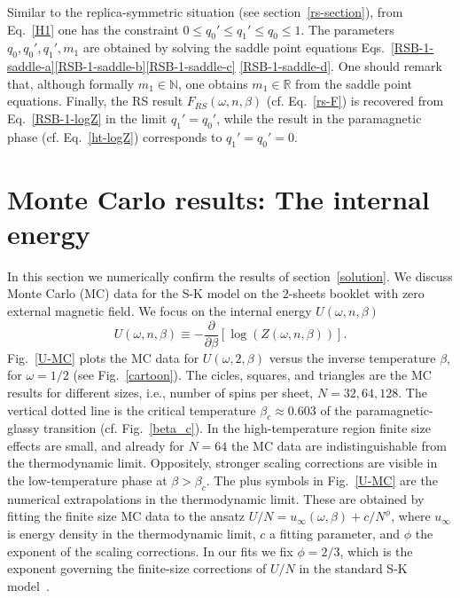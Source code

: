 \documentclass[twocolumn,superscriptaddress,prb,10pt]{revtex4-1}
\begin{document}
%
Similar to the replica-symmetric situation (see section~\ref{rs-section}), 
from Eq.~\eqref{H1} one has the constraint $0\le q_0'\le q_1'\le q_0\le 1$.
The parameters $q_0,q_0',q_1',m_1$ are obtained by solving the saddle 
point equations Eqs.~\eqref{RSB-1-saddle-a}\eqref{RSB-1-saddle-b}\eqref{RSB-1-saddle-c}
\eqref{RSB-1-saddle-d}. One should remark that, although formally $m_1\in\mathbb{N}$, 
one obtains $m_1\in\mathbb{R}$ from the saddle point equations. 
Finally, the RS result $F_{RS}(\omega,n,\beta)$ (cf. Eq.~\eqref{rs-F}) is recovered 
from Eq.~\eqref{RSB-1-logZ} in the limit $q_1'=q_0'$, while the result in the 
paramagnetic phase (cf. Eq.~\eqref{ht-logZ}) corresponds to $q_1'=q_0'=0$.

\section{Monte Carlo results: The internal energy}
\label{mc-results}

In this section we numerically confirm the results of section~\ref{solution}. 
We discuss Monte Carlo (MC) data for the S-K model on the $2$-sheets booklet 
with zero external magnetic field. We focus on the internal energy $U(\omega,n,
\beta)$ 
%
\begin{equation}
\label{U-def}
U(\omega,n,\beta)\equiv-\frac{\partial}{\partial\beta}
[\log(Z(\omega,n,\beta))]. 
\end{equation}
%  
Fig.~\ref{U-MC} plots the MC data for $U(\omega,2,\beta)$ versus the inverse temperature 
$\beta$, for $\omega=1/2$ (see Fig.~\ref{cartoon}). The cicles, squares, and triangles 
are the MC results for different sizes, i.e., number of spins per sheet, $N=32,64,128$. 
The vertical dotted line is the critical temperature $\beta_c\approx 0.603$ of 
the paramagnetic-glassy transition (cf. Fig.~\ref{beta_c}). In the high-temperature 
region finite size effects are small, and already for $N=64$ the MC data are indistinguishable 
from the thermodynamic limit. Oppositely, stronger scaling corrections are  visible in 
the low-temperature phase at $\beta>\beta_c$. 
The plus symbols in Fig.~\ref{U-MC} are the numerical extrapolations in the 
thermodynamic limit. These are obtained by fitting the finite size MC data 
to the ansatz $U/N=u_{\infty}(\omega,\beta)+c/N^{\phi}$, where 
$u_{\infty}$ is energy density in the thermodynamic limit, $c$ a fitting parameter, and 
$\phi$ the exponent of the scaling corrections. In our fits we fix $\phi=2/3$, which 
is the exponent governing the finite-size corrections of $U/N$ in 
the standard S-K model~\cite{billoire-2007,aspelmeier-2008}. 
\end{document}
